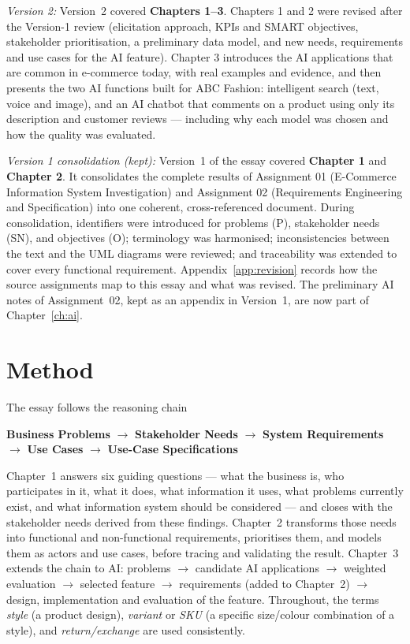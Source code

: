 \documentclass[11pt,a4paper,oneside]{extreport}
\newif\ifshowvtwo
\newcommand{\upd}[1]{\ifshowvtwo\textcolor{red}{#1}\else#1\fi}
\begin{document}
\upd{\textit{Version 2:} Version~2 covered \textbf{Chapters 1--3}. Chapters 1 and 2 were revised after the Version-1 review (elicitation approach, KPIs and SMART objectives, stakeholder prioritisation, a preliminary data model, and new needs, requirements and use cases for the AI feature). Chapter 3 introduces the AI applications that are common in e-commerce today, with real examples and evidence, and then presents the two AI functions built for ABC Fashion: intelligent search (text, voice and image), and an AI chatbot that comments on a product using only its description and customer reviews --- including why each model was chosen and how the quality was evaluated.}

\textit{Version 1 consolidation (kept):} Version~1 of the essay covered \textbf{Chapter 1} and \textbf{Chapter 2}. It consolidates the complete results of Assignment 01 (E-Commerce Information System Investigation) and Assignment 02 (Requirements Engineering and Specification) into one coherent, cross-referenced document. During consolidation, identifiers were introduced for problems (P), stakeholder needs (SN), and objectives (O); terminology was harmonised; inconsistencies between the text and the UML diagrams were reviewed; and traceability was extended to cover every functional requirement. Appendix~\ref{app:revision} records how the source assignments map to this essay and what was revised. \upd{The preliminary AI notes of Assignment~02, kept as an appendix in Version~1, are now part of Chapter~\ref{ch:ai}.}

\section*{Method}
The essay follows the reasoning chain
\begin{center}
\textbf{Business Problems} $\rightarrow$ \textbf{Stakeholder Needs} $\rightarrow$ \textbf{System Requirements} $\rightarrow$ \textbf{Use Cases} $\rightarrow$ \textbf{Use-Case Specifications}
\end{center}
Chapter~1 answers six guiding questions --- what the business is, who participates in it, what it does, what information it uses, what problems currently exist, and what information system should be considered --- and closes with the stakeholder needs derived from these findings. Chapter~2 transforms those needs into functional and non-functional requirements, prioritises them, and models them as actors and use cases, before tracing and validating the result. \upd{Chapter~3 extends the chain to AI: problems $\rightarrow$ candidate AI applications $\rightarrow$ weighted evaluation $\rightarrow$ selected feature $\rightarrow$ requirements (added to Chapter~2) $\rightarrow$ design, implementation and evaluation of the feature.} Throughout, the terms \emph{style} (a product design), \emph{variant} or \emph{SKU} (a specific size/colour combination of a style), and \emph{return/exchange} are used consistently.
\end{document}
